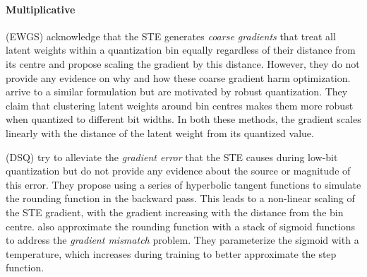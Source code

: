 
\paragraph{Multiplicative} \citet{EWGS} (EWGS) acknowledge that the STE generates \textit{coarse gradients} that treat all latent weights within a quantization bin equally regardless of their distance from its centre and propose scaling the gradient by this distance. However, they do not provide any evidence on why and how these coarse gradient harm optimization.  \citet{PBGS} arrive to a similar formulation but are motivated by robust quantization. They claim that clustering latent weights around bin centres makes them more robust when quantized to different bit widths. In both these methods, the gradient scales linearly with the distance of the latent weight from its quantized value.


\citet{DSQ} (DSQ) try to alleviate the \textit{gradient error} that the STE causes during low-bit quantization but do not provide any evidence about the source or magnitude of this error. They propose using a series of hyperbolic tangent functions to simulate the rounding function in the backward pass. This leads to a non-linear scaling of the STE gradient, with the gradient increasing with the distance from the bin centre. \citet{quantization_nets} also approximate the rounding function with  a stack of sigmoid functions to address the \textit{gradient mismatch} problem. They parameterize the sigmoid with a temperature, which increases during training to better approximate the step function.

